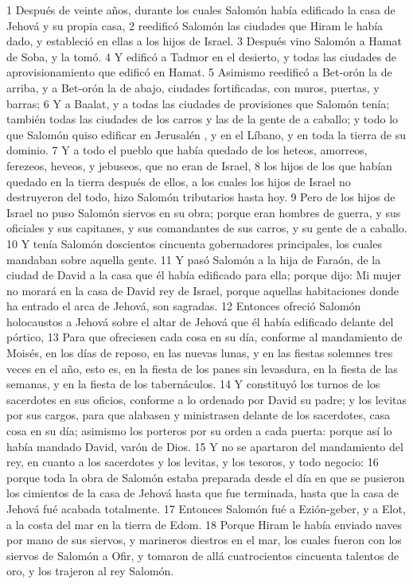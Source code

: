 1 Después de veinte años, durante los cuales Salomón había edificado la casa de Jehová y su propia casa,
2 reedificó Salomón las ciudades que Hiram le había dado, y estableció en ellas a los hijos de Israel.
3 Después vino Salomón a Hamat de Soba, y la tomó.
4 Y edificó a Tadmor en el desierto, y todas las ciudades de aprovisionamiento que edificó en Hamat.
5 Asimismo reedificó a Bet-orón la de arriba, y a Bet-orón  la de abajo, ciudades fortificadas, con muros, puertas, y barras;
6 Y a Baalat, y a todas las ciudades de provisiones que Salomón tenía; también todas las ciudades de los carros y las de la gente de a caballo; y todo lo que Salomón quiso edificar en Jerusalén , y en el Líbano, y en toda la tierra de su dominio.
7 Y a todo el pueblo que había quedado de los heteos, amorreos, ferezeos, heveos, y jebuseos, que no eran de Israel,
8 los hijos de los que habían quedado en la tierra después de ellos, a los cuales los hijos de Israel no destruyeron del todo, hizo Salomón tributarios hasta hoy.
9 Pero de los hijos de Israel no puso Salomón siervos en su obra; porque eran hombres de guerra, y sus oficiales y sus capitanes, y sus comandantes de sus carros, y su gente de a caballo.
10 Y tenía Salomón doscientos cincuenta gobernadores principales, los cuales mandaban sobre aquella gente.
11 Y pasó Salomón a la hija de Faraón, de la ciudad de David a la casa que él había edificado para ella; porque dijo: Mi mujer no morará en la casa de David rey de Israel, porque aquellas habitaciones donde ha entrado el arca de Jehová, son sagradas.
12 Entonces ofreció Salomón holocaustos a Jehová sobre el altar de Jehová que él había edificado delante del pórtico,
13 Para que ofreciesen cada cosa en su día, conforme al mandamiento de Moisés, en los días de reposo, en las nuevas lunas, y en las fiestas solemnes tres veces en el año, esto es, en la fiesta de los panes sin levasdura, en la fiesta de las semanas, y en la fiesta de los tabernáculos.
14 Y constituyó los turnos de los sacerdotes en sus oficios, conforme a lo ordenado por David su padre; y los levitas por sus cargos, para que alabasen y ministrasen delante de los sacerdotes, casa cosa en su día; asimismo los porteros por su orden a cada puerta: porque así lo había mandado David, varón de Dios.
15 Y no se apartaron del mandamiento del rey, en cuanto a los sacerdotes y los levitas, y los tesoros, y todo negocio:
16 porque toda la obra de Salomón estaba preparada desde el día en que se pusieron los cimientos de la casa de Jehová hasta que fue terminada, hasta que la casa de Jehová fué acabada totalmente.
17 Entonces Salomón fué a Ezión-geber, y a Elot, a la costa del mar en la tierra de Edom.
18 Porque Hiram le había enviado naves por mano de sus siervos, y marineros diestros en el mar, los cuales fueron con los siervos de Salomón a Ofir, y tomaron de allá cuatrocientos cincuenta talentos de oro, y los trajeron al rey Salomón.

